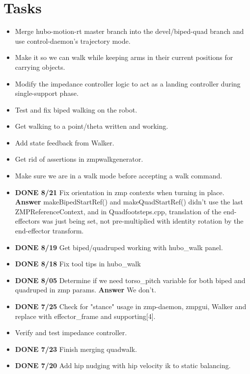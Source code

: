 \documentclass[letterpaper, 10 pt]{report}
\begin{document}
\section*{Tasks}
\begin{itemize}
\item Merge hubo-motion-rt master branch into the devel/biped-quad branch and use control-daemon's trajectory mode.
\item Make it so we can walk while keeping arms in their current positions for carrying objects.
\item Modify the impedance controller logic to act as a landing controller during single-support phase.
\item Test and fix biped walking on the robot.
\item Get walking to a point/theta written and working.
\item Add state feedback from Walker.
\item Get rid of assertions in zmpwalkgenerator.
\item Make sure we are in a walk mode before accepting a walk command.
\item \textbf{DONE 8/21} Fix orientation in zmp contexts when turning in place. \newline
\textbf{Answer} makeBipedStartRef() and makeQuadStartRef() didn't use the last ZMPReferenceContext, and in Quadfootsteps.cpp, translation of the end-effectors was just being set, not pre-multiplied with identity rotation by the end-effector transform.
\item \textbf{DONE 8/19} Get biped/quadruped working with hubo\_walk panel.
\item \textbf{DONE 8/18} Fix tool tips in hubo\_walk
\item \textbf{DONE 8/05} Determine if we need torso\_pitch variable for both biped and quadruped in zmp params. \textbf{Answer} We don't.
\item \textbf{DONE 7/25} Check for "stance" usage in zmp-daemon, zmpgui, Walker and replace with effector\_frame and supporting[4].
\item Verify and test impedance controller.
\item \textbf{DONE 7/23} Finish merging quadwalk.
\item \textbf{DONE 7/20} Add hip nudging with hip velocity ik to static balancing.
\end{itemize}
\end{document}
